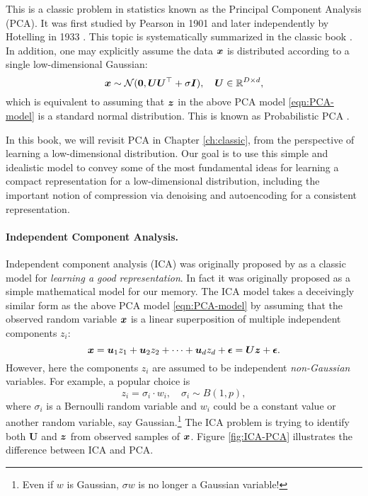 \documentclass[\toplevelprefix/book-main.tex]{subfiles}
\begin{document}
This is a classic problem in statistics known as the Principal Component Analysis (PCA). It was first studied by Pearson in 1901 \cite{Pearson1901} and later independently by Hotelling in 1933 \cite{Hotelling1933}. This topic is systematically summarized in the classic book \cite{Jolliffe1986,JolliffeI2002}.
In addition, one may explicitly assume the data $\bm{x}$ is distributed according to a single low-dimensional Gaussian:
\begin{equation}
    \bm{x} \sim \mathcal{N}(\boldsymbol{0}, \boldsymbol{U}\boldsymbol{U}^\top + \sigma \bm{I}), \quad \boldsymbol{U} \in \mathbb{R}^{D\times d},
\end{equation}
which is equivalent to assuming that  $\bm{z}$ in the above PCA model \eqref{eqn:PCA-model} is a standard normal distribution. 
This is known as Probabilistic PCA \cite{TippingM1999}. 

In this book, we will revisit  PCA in Chapter \ref{ch:classic}, from the perspective of learning a low-dimensional distribution. Our goal is to use this simple and idealistic model to convey some of the most fundamental ideas for learning a compact representation for a low-dimensional distribution, including the important notion of compression via denoising and autoencoding for a consistent representation.

\paragraph{Independent Component Analysis.}
Independent component analysis (ICA) was originally proposed by \cite{Ans-1985} as a classic model for {\em learning a good representation}. In fact it was originally proposed as a simple mathematical model for our memory. The ICA model takes a deceivingly similar form as the above PCA model \eqref{eqn:PCA-model} by assuming that the observed random variable $\bm{x}$ is a linear superposition of multiple independent components $z_i$:
\begin{equation}
    \bm{x} = \boldsymbol{u}_1 z_1 + \boldsymbol{u}_2 z_2 + \cdots + \boldsymbol{u}_d z_d  + \boldsymbol{\epsilon} =  \boldsymbol{U} \bm{z} + \boldsymbol{\epsilon}.
    \label{eqn:ICA-model}
\end{equation}
However, here the components $z_i$ are assumed to be independent {\em non-Gaussian} variables. For example, a popular choice is
\begin{equation}
    z_i = \sigma_i \cdot w_i, \quad \sigma_i \sim B(1,p),
    \label{eqn:ICA-modes}
\end{equation}
where $\sigma_i$ is a Bernoulli random variable and $w_i$ could be a constant value or another random variable, say Gaussian.\footnote{Even if $w$ is Gaussian, $\sigma w$ is no longer a Gaussian variable!}  The ICA problem is trying to identify both $\boldsymbol{U}$ and $\bm{z}$ from observed samples of $\bm{x}$. Figure \ref{fig:ICA-PCA} illustrates the difference between ICA and PCA.
\end{document}
